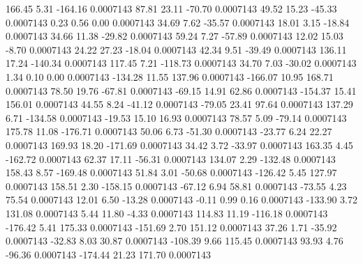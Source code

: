       166.45        5.31     -164.16     0.0007143
       87.81       23.11      -70.70     0.0007143
       49.52       15.23      -45.33     0.0007143
        0.23        0.56        0.00     0.0007143
       34.69        7.62      -35.57     0.0007143
       18.01        3.15      -18.84     0.0007143
       34.66       11.38      -29.82     0.0007143
       59.24        7.27      -57.89     0.0007143
       12.02       15.03       -8.70     0.0007143
       24.22       27.23      -18.04     0.0007143
       42.34        9.51      -39.49     0.0007143
      136.11       17.24     -140.34     0.0007143
      117.45        7.21     -118.73     0.0007143
       34.70        7.03      -30.02     0.0007143
        1.34        0.10        0.00     0.0007143
     -134.28       11.55      137.96     0.0007143
     -166.07       10.95      168.71     0.0007143
       78.50       19.76      -67.81     0.0007143
      -69.15       14.91       62.86     0.0007143
     -154.37       15.41      156.01     0.0007143
       44.55        8.24      -41.12     0.0007143
      -79.05       23.41       97.64     0.0007143
      137.29        6.71     -134.58     0.0007143
      -19.53       15.10       16.93     0.0007143
       78.57        5.09      -79.14     0.0007143
      175.78       11.08     -176.71     0.0007143
       50.06        6.73      -51.30     0.0007143
      -23.77        6.24       22.27     0.0007143
      169.93       18.20     -171.69     0.0007143
       34.42        3.72      -33.97     0.0007143
      163.35        4.45     -162.72     0.0007143
       62.37       17.11      -56.31     0.0007143
      134.07        2.29     -132.48     0.0007143
      158.43        8.57     -169.48     0.0007143
       51.84        3.01      -50.68     0.0007143
     -126.42        5.45      127.97     0.0007143
      158.51        2.30     -158.15     0.0007143
      -67.12        6.94       58.81     0.0007143
      -73.55        4.23       75.54     0.0007143
       12.01        6.50      -13.28     0.0007143
       -0.11        0.99        0.16     0.0007143
     -133.90        3.72      131.08     0.0007143
        5.44       11.80       -4.33     0.0007143
      114.83       11.19     -116.18     0.0007143
     -176.42        5.41      175.33     0.0007143
     -151.69        2.70      151.12     0.0007143
       37.26        1.71      -35.92     0.0007143
      -32.83        8.03       30.87     0.0007143
     -108.39        9.66      115.45     0.0007143
       93.93        4.76      -96.36     0.0007143
     -174.44       21.23      171.70     0.0007143
